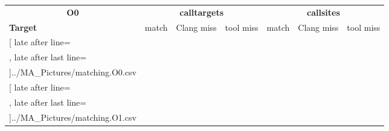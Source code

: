 \begin{table}
	\begin{tabular}{l|c|c|c|c|c|c}%
	\toprule
	\multicolumn{1}{c}{\bfseries O0} & \multicolumn{3}{c|}{ {\bfseries calltargets}} & \multicolumn{3}{c}{{\bfseries callsites} }\\
	\bfseries Target & match & Clang miss &  tool miss &  match & Clang miss & tool miss%
	\\\midrule
	\csvreader[ late after line=\\, late after last line=\\\midrule]{../MA_Pictures/matching.O0.csv}{
	}
	{\csvcoli & \csvcoliii & \csvcoliv & \csvcolv & \csvcolix & \csvcolx & \csvcolxi }%
%
%
	\multicolumn{1}{c}{\bfseries O1 }%
	\\\midrule
	\csvreader[ late after line=\\, late after last line=\\\midrule]{../MA_Pictures/matching.O1.csv}{
	}
	{\csvcoli & \csvcoliii & \csvcoliv & \csvcolv & \csvcolix & \csvcolx & \csvcolxi }%
%
%

\end{tabular}
\end{table}
